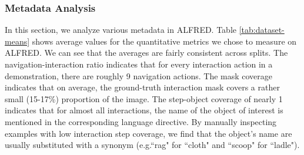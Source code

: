 \documentclass[11pt,a4paper]{article}
\begin{document}

\subsubsection{Metadata Analysis}
In this section, we analyze various metadata in ALFRED. Table \ref{tab:dataset-means} shows average values for the quantitative metrics we chose to measure on ALFRED. We can see that the averages are fairly consistent across splits. The navigation-interaction ratio indicates that for every interaction action in a demonstration, there are roughly 9 navigation actions. The mask coverage indicates that on average, the ground-truth interaction mask covers a rather small (15-17\%) proportion of the image. The step-object coverage of nearly 1 indicates that for almost all interactions, the name of the object of interest is mentioned in the corresponding language directive. By manually inspecting examples with low interaction step coverage, we find that the object's name are usually substituted with a synonym (e.g.``rag" for ``cloth" and ``scoop" for ``ladle").
\end{document}
